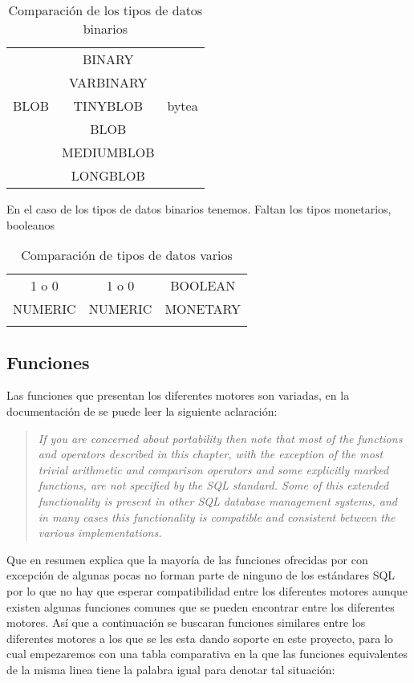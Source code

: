 %
\begin{table}[h]
\begin{center}
\begin{tabular}{|c|c|c|}
\hline \s & \m & \p \\ 
\hline  & BINARY &  \\  
 & VARBINARY &  \\ 
 BLOB & TINYBLOB & bytea \\ 
 & BLOB &  \\ 
 & MEDIUMBLOB &  \\
& LONGBLOB &  \\ 
\hline 
\end{tabular} 
\end{center}
\caption{Comparación de los tipos de datos binarios}
\end{table}
%
En el caso de los tipos de datos binarios tenemos.
Faltan los tipos monetarios, booleanos
%
\begin{table}[h]
\begin{center}
\begin{tabular}{|c|c|c|}
\hline \s & \m & \p \\ 
\hline 1 o 0 & 1 o 0 & BOOLEAN \\  
\hline NUMERIC & NUMERIC & MONETARY \\  
&  &  \\  
\hline 
\end{tabular} 
\end{center}
\caption{Comparación de tipos de datos varios}
\end{table}
%
\subsection{Funciones}
\label{especificacion:funciones} 
Las funciones que presentan los diferentes motores son variadas, en la documentación de  \p se puede leer\citep{postgre:functions} la siguiente aclaración:
%
\begin{quotation}
\textit{If you are concerned about portability then note that most of the functions and operators described in this chapter, with the exception of the most trivial arithmetic and comparison operators and some explicitly marked functions, are not specified by the SQL standard. Some of this extended functionality is present in other SQL database management systems, and in many cases this functionality is compatible and consistent between the various implementations.}
\end{quotation}
%
Que en resumen explica que la mayoría de las funciones ofrecidas por \p con excepción de algunas pocas no forman parte de ninguno de los estándares SQL por lo que no hay que esperar compatibilidad entre los diferentes motores aunque existen algunas funciones comunes que se pueden encontrar entre los diferentes motores. Así que a continuación se buscaran funciones similares entre los diferentes motores a los que se les esta dando soporte en este proyecto, para lo cual empezaremos con una tabla comparativa en la que las funciones equivalentes de la misma linea tiene la palabra igual para denotar tal situación:


